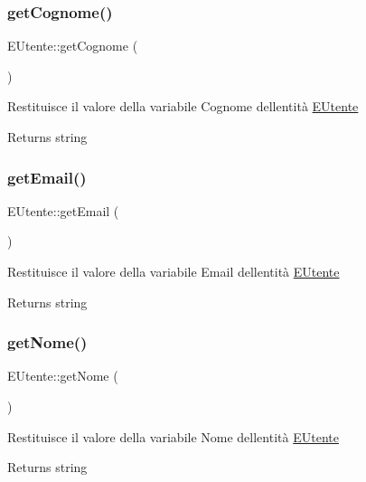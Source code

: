 \subsubsection{\texorpdfstring{get\+Cognome()}{getCognome()}}
{\footnotesize\ttfamily E\+Utente\+::get\+Cognome (\begin{DoxyParamCaption}{ }\end{DoxyParamCaption})}

Restituisce il valore della variabile Cognome dell\textquotesingle{}entità \mbox{\hyperlink{class_e_utente}{E\+Utente}}

\begin{DoxyReturn}{Returns}
string 
\end{DoxyReturn}
\mbox{\label{class_e_utente_a695e3ad33a21d12622147a98cd19a57c}} 
\subsubsection{\texorpdfstring{get\+Email()}{getEmail()}}
{\footnotesize\ttfamily E\+Utente\+::get\+Email (\begin{DoxyParamCaption}{ }\end{DoxyParamCaption})}

Restituisce il valore della variabile Email dell\textquotesingle{}entità \mbox{\hyperlink{class_e_utente}{E\+Utente}}

\begin{DoxyReturn}{Returns}
string 
\end{DoxyReturn}
\mbox{\label{class_e_utente_a99ca081bec90946b4770c415218b41aa}} 
\subsubsection{\texorpdfstring{get\+Nome()}{getNome()}}
{\footnotesize\ttfamily E\+Utente\+::get\+Nome (\begin{DoxyParamCaption}{ }\end{DoxyParamCaption})}

Restituisce il valore della variabile Nome dell\textquotesingle{}entità \mbox{\hyperlink{class_e_utente}{E\+Utente}}

\begin{DoxyReturn}{Returns}
string 
\end{DoxyReturn}
\mbox{\label{class_e_utente_a182d7665aec0803b5dbbdd0cc7b30f4d}} 
